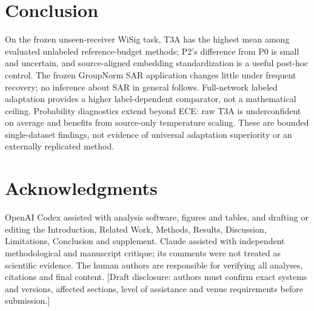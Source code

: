 \section{Conclusion}
On the frozen unseen-receiver WiSig task, T3A has the highest mean among evaluated unlabeled reference-budget methods; P2's difference from P0 is small and uncertain, and source-aligned embedding standardization is a useful post-hoc control. The frozen GroupNorm SAR application changes little under frequent recovery; no inference about SAR in general follows. Full-network labeled adaptation provides a higher label-dependent comparator, not a mathematical ceiling. Probability diagnostics extend beyond ECE: raw T3A is underconfident on average and benefits from source-only temperature scaling. These are bounded single-dataset findings, not evidence of universal adaptation superiority or an externally replicated method.

\section*{Acknowledgments}
OpenAI Codex assisted with analysis software, figures and tables, and drafting or editing the Introduction, Related Work, Methods, Results, Discussion, Limitations, Conclusion and supplement. Claude assisted with independent methodological and manuscript critique; its comments were not treated as scientific evidence. The human authors are responsible for verifying all analyses, citations and final content. [Draft disclosure: authors must confirm exact systems and versions, affected sections, level of assistance and venue requirements before submission.]

